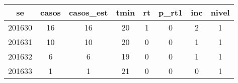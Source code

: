 \begin{tabular}{c|ccccccc}
  \hline
se & casos & casos\_est & tmin & rt & p\_rt1 & inc & nivel \\ 
  \hline
201630 & 16 & 16 & 20 & 1 & 0 & 2 & 1 \\ 
  201631 & 10 & 10 & 20 & 0 & 0 & 1 & 1 \\ 
  201632 & 6 & 6 & 19 & 0 & 0 & 1 & 1 \\ 
  201633 & 1 & 1 & 21 & 0 & 0 & 0 & 1 \\ 
   \hline
\end{tabular}
